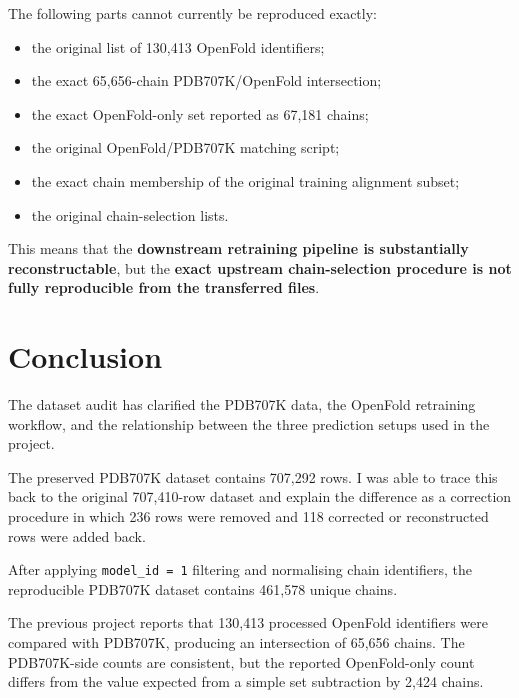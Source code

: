 \documentclass[11pt,a4paper]{article}
\begin{document}
The following parts cannot currently be reproduced exactly:

\begin{itemize}[leftmargin=*]

    \item the original list of 130,413 OpenFold identifiers;

    \item the exact 65,656-chain PDB707K/OpenFold intersection;

    \item the exact OpenFold-only set reported as 67,181 chains;

    \item the original OpenFold/PDB707K matching script;

    \item the exact chain membership of the original training alignment subset;

    \item the original chain-selection lists.

\end{itemize}

This means that the \textbf{downstream retraining pipeline is substantially reconstructable}, but the \textbf{exact upstream chain-selection procedure is not fully reproducible from the transferred files}.


\section{Conclusion}

The dataset audit has clarified the PDB707K data, the OpenFold retraining workflow, and the relationship between the three prediction setups used in the project.

The preserved PDB707K dataset contains 707,292 rows. I was able to trace this back to the original 707,410-row dataset and explain the difference as a correction procedure in which 236 rows were removed and 118 corrected or reconstructed rows were added back.

After applying \texttt{model\_id = 1} filtering and normalising chain identifiers, the reproducible PDB707K dataset contains 461,578 unique chains.

The previous project reports that 130,413 processed OpenFold identifiers were compared with PDB707K, producing an intersection of 65,656 chains. The PDB707K-side counts are consistent, but the reported OpenFold-only count differs from the value expected from a simple set subtraction by 2,424 chains.
\end{document}
